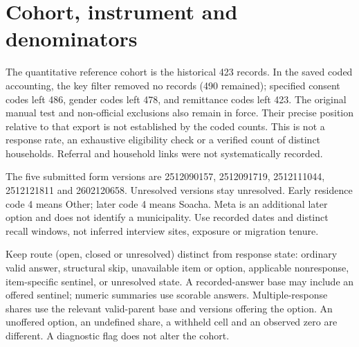 \section{Cohort, instrument and denominators}
The quantitative reference cohort is the historical 423 records. In the saved coded accounting, the key filter removed no records (490 remained); specified consent codes left 486, gender codes left 478, and remittance codes left 423. The original manual test and non-official exclusions also remain in force. Their precise position relative to that export is not established by the coded counts. This is not a response rate, an exhaustive eligibility check or a verified count of distinct households. Referral and household links were not systematically recorded.

The five submitted form versions are 2512090157, 2512091719, 2512111044, 2512121811 and 2602120658. Unresolved versions stay unresolved. Early residence code 4 means Other; later code 4 means Soacha. Meta is an additional later option and does not identify a municipality. Use recorded dates and distinct recall windows, not inferred interview sites, exposure or migration tenure.

Keep route (open, closed or unresolved) distinct from response state: ordinary valid answer, structural skip, unavailable item or option, applicable nonresponse, item-specific sentinel, or unresolved state. A recorded-answer base may include an offered sentinel; numeric summaries use scorable answers. Multiple-response shares use the relevant valid-parent base and versions offering the option. An unoffered option, an undefined share, a withheld cell and an observed zero are different. A diagnostic flag does not alter the cohort.

